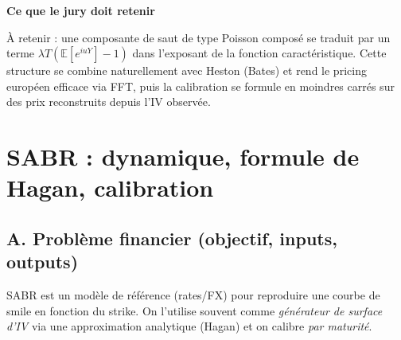 \documentclass[11pt,a4paper]{report}
\theoremstyle{definition}
\theoremstyle{plain}
\theoremstyle{remark}
\newcommand{\E}{\mathbb{E}}
\newcommand{\1}{\mathbf{1}}
\newcommand{\filepath}[1]{\texttt{\detokenize{#1}}}
\newcommand{\codeid}[1]{\texttt{\detokenize{#1}}}
\newcommand{\NonImplem}{\textbf{non implémenté dans le code actuel}}
\newenvironment{jurybox}{
\par\medskip
\begin{lrbox}{\juryboxbox}
\begin{minipage}{0.97\textwidth}
\textbf{Ce que le jury doit retenir}\par\smallskip
\ignorespaces
}{
\unskip\end{minipage}
\end{lrbox}
\noindent\fcolorbox{black!30}{black!3}{\usebox{\juryboxbox}}
\par\medskip
}
\begin{document}

\begin{jurybox}
À retenir : une composante de saut de type Poisson composé se traduit par un terme $\lambda T(\E[e^{iuY}]-1)$ dans l'exposant de la fonction caractéristique. Cette structure se combine naturellement avec Heston (Bates) et rend le pricing européen efficace via FFT, puis la calibration se formule en moindres carrés sur des prix reconstruits depuis l'IV observée.
\end{jurybox}

\chapter{SABR : dynamique, formule de Hagan, calibration}

\section{A. Problème financier (objectif, inputs, outputs)}
SABR est un modèle de référence (rates/FX) pour reproduire une courbe de smile en fonction du strike. On l'utilise souvent comme \emph{générateur de surface d'IV} via une approximation analytique (Hagan) et on calibre \emph{par maturité}.
\end{document}
